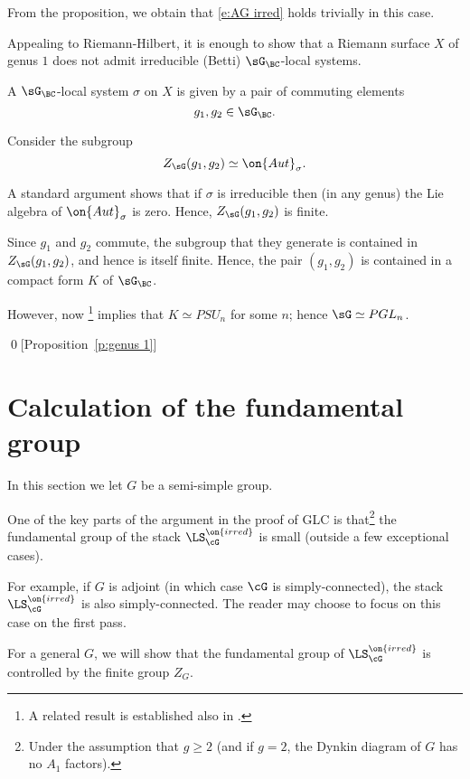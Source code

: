 \documentclass[9pt]{amsart}
\theoremstyle{remark}
\theoremstyle{definition}
\theoremstyle{remark}
\newcommand{\propref}[1]{Proposition~\ref{#1}}
\numberwithin{equation}{section}
\begin{document}
From the proposition, we obtain that \eqref{e:AG irred} holds trivially in this case.  

\sssec{Proof of \propref{p:genus 1}}

Appealing to Riemann-Hilbert, it is enough to show that a Riemann surface $X$ of genus $1$ does not
admit irreducible (Betti) $\sG_\BC$-local systems. 

\medskip

A $\sG_\BC$-local system $\sigma$ on $X$ is given by a pair of commuting elements
$$g_1,g_2\in \sG_\BC.$$

Consider the subgroup 
$$Z_\sG(g_1,g_2)\simeq \on{Aut}_\sigma.$$

A standard argument shows that if $\sigma$ is irreducible then (in any genus) 
the Lie algebra of $\on{Aut}_\sigma$ is zero. Hence, $Z_\sG(g_1,g_2)$ is finite. 

\medskip

Since $g_1$ and $g_2$ commute, the subgroup that they generate is contained 
in $Z_\sG(g_1,g_2)$, and hence is itself finite. Hence, the pair $(g_1,g_2)$ 
is contained in a compact form $K$ of $\sG_\BC$.

\medskip

However, now \cite[Proposition 4.1.1]{BFM}\footnote{A related result is established also in \cite{KS}.}  
implies that $K\simeq PSU_n$
for some $n$; hence $\sG\simeq PGL_n$.

\qed[\propref{p:genus 1}]

\section{Calculation of the fundamental group} \label{s:pi 1}

In this section we let $G$ be a semi-simple group. 

\medskip

One of the key parts of the argument in the proof of GLC is that\footnote{Under the assumption that $g\geq 2$ (and if $g=2$, the Dynkin diagram
of $G$ has no $A_1$ factors).} the fundamental group of the stack $\LS_\cG^{\on{irred}}$ is small
(outside a few exceptional cases).

\medskip

For example, if $G$ is adjoint (in which case $\cG$ is simply-connected), the stack $\LS_\cG^{\on{irred}}$ is also simply-connected. The reader may
choose to focus on this case on the first pass.

\medskip

For a general $G$, we will show that the fundamental group of $\LS_\cG^{\on{irred}}$ is controlled by the finite group $Z_G$. 
\end{document}
